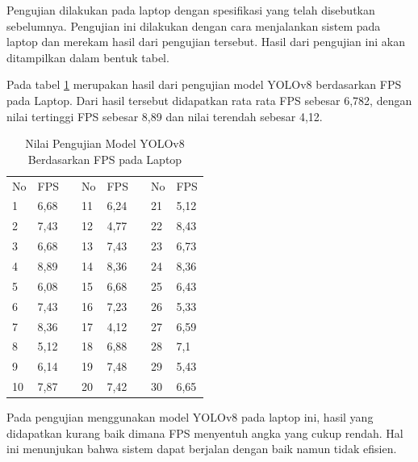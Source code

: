 Pengujian dilakukan pada laptop dengan spesifikasi yang telah disebutkan sebelumnya. Pengujian ini dilakukan dengan cara menjalankan sistem pada laptop dan merekam hasil dari pengujian tersebut. Hasil dari pengujian ini akan ditampilkan dalam bentuk tabel. 

Pada tabel \ref{tb:TabelYolov8Laptop} merupakan hasil dari pengujian model YOLOv8 berdasarkan FPS pada Laptop. Dari hasil tersebut didapatkan rata rata FPS sebesar 6,782, dengan nilai tertinggi FPS sebesar 8,89 dan nilai terendah sebesar 4,12.

\begin{table}[H]
  \caption{Nilai Pengujian Model YOLOv8 Berdasarkan FPS pada Laptop} 
  \label{tb:TabelYolov8Laptop}
  \centering
  \begin{tabular}{|l|l|l|l|l|l|l|l|}
  \cline{1-2} \cline{4-5} \cline{7-8}
  No & FPS  &  & No & FPS  &  & No & FPS  \\ \cline{1-2} \cline{4-5} \cline{7-8} 
  1  & 6,68 &  & 11 & 6,24 &  & 21 & 5,12 \\ \cline{1-2} \cline{4-5} \cline{7-8} 
  2  & 7,43 &  & 12 & 4,77 &  & 22 & 8,43 \\ \cline{1-2} \cline{4-5} \cline{7-8} 
  3  & 6,68 &  & 13 & 7,43 &  & 23 & 6,73 \\ \cline{1-2} \cline{4-5} \cline{7-8} 
  4  & 8,89 &  & 14 & 8,36 &  & 24 & 8,36 \\ \cline{1-2} \cline{4-5} \cline{7-8} 
  5  & 6,08 &  & 15 & 6,68 &  & 25 & 6,43 \\ \cline{1-2} \cline{4-5} \cline{7-8} 
  6  & 7,43 &  & 16 & 7,23 &  & 26 & 5,33 \\ \cline{1-2} \cline{4-5} \cline{7-8} 
  7  & 8,36 &  & 17 & 4,12 &  & 27 & 6,59 \\ \cline{1-2} \cline{4-5} \cline{7-8} 
  8  & 5,12 &  & 18 & 6,88 &  & 28 & 7,1  \\ \cline{1-2} \cline{4-5} \cline{7-8} 
  9  & 6,14 &  & 19 & 7,48 &  & 29 & 5,43 \\ \cline{1-2} \cline{4-5} \cline{7-8} 
  10 & 7,87 &  & 20 & 7,42 &  & 30 & 6,65 \\ \cline{1-2} \cline{4-5} \cline{7-8} 
  \end{tabular}
  \end{table}

Pada pengujian menggunakan model YOLOv8 pada laptop ini, hasil yang didapatkan kurang baik dimana FPS menyentuh angka yang cukup rendah. Hal ini menunjukan bahwa sistem dapat berjalan dengan baik namun tidak efisien.

